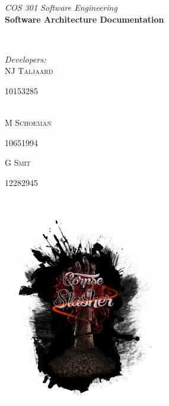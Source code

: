 \documentclass[letterpaper]{article}
\makeatletter
\def\printauthor{%
    {\large \@author}}
\makeatother
\begin{document}
\begin{titlepage}
\begin{center}
\begin{minipage}{0.4\textwidth}
\begin{flushleft} \large
\emph{COS 301 Software Engineering}\\
\vspace{1cm}
\textbf{Software Architecture Documentation}
\end{flushleft}
\end{minipage}
~
\begin{minipage}{0.4\textwidth}
	\begin{flushright} \large
	\emph{Developers:} \\
		NJ \textsc{Taljaard} \\
			\begin{small}
				10153285
			\end{small} \\
		M  \textsc{Schoeman} \\
			\begin{small}
				10651994 \\
			\end{small}
		G  \textsc{Smit} \\
			\begin{small}
				12282945
			\end{small}
	\end{flushright}
\end{minipage}\\



\includegraphics[width=70mm, height=90mm]{corpseslasher.png}\\ %
 

\end{center}
\end{titlepage}
\end{document}
